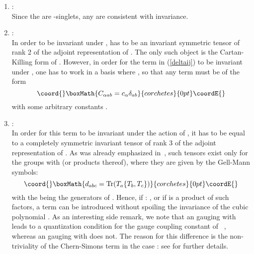 \documentclass[a4paper,11pt]{article}
\begin{document}
\begin{enumerate}
\item {}\coordHE{}:\\
Since the \coordHE{} are \coordHE{}-singlets, any
\coordHE{} are consistent with \coordHE{} invariance.

\item {}\coordHE{}:\\
In order to be invariant under \coordHE{}, \coordHE{} has to be an
invariant symmetric tensor of rank 2 of the adjoint representation
of \coordHE{}. The only such object is the Cartan-Killing form
\coordHE{} of \coordHE{}. However, in order for the \coordHE{} term
in (\ref{deltaij}) to be invariant under \coordHE{}, one has to work in a
basis where \coordHE{}, so that any term \coordHE{} must be of the form
\begin{displaymath}\coord{}\boxMath{
C_{\alpha ab}=c_{\alpha}\delta_{ab}
}{corchetes}{0pt}\coordE{}\end{displaymath}
with some arbitrary constants \coordHE{}.

\item {}\coordHE{}:\\
In order for this term to be invariant under the action of \coordHE{}, it
has to be equal to a completely symmetric invariant tensor of rank
3 of the adjoint representation of \coordHE{}. As was already emphasized
in~\cite{GZ1}, such tensors exist only for the groups \coordHE{} with
\coordHE{} (or  products thereof), where they are given by the
Gell-Mann \coordHE{} symbols:
\begin{displaymath}\coord{}\boxMath{
d_{abc}=\textrm{Tr}(T_{a}\{T_{b},T_{c}\})
}{corchetes}{0pt}\coordE{}\end{displaymath}
with the \coordHE{} being the generators of \coordHE{}. Hence, if
\coordHE{}: \coordHE{}, or if \coordHE{} is a product of such \coordHE{}
factors, a term \coordHE{} can be
introduced without spoiling the \coordHE{} invariance of the cubic
polynomial \coordHE{}. As an interesting side remark, we note that an
\coordHE{} gauging with \coordHE{} leads to a quantization
condition for the gauge coupling constant of \coordHE{}~\cite{GST1.5},
whereas an \coordHE{} gauging with \coordHE{} does not. The reason
for this difference is the non-triviality of the Chern-Simons term
in the case \coordHE{}: see \cite{GST1.5} for further
details.


\end{enumerate}
\end{document}
